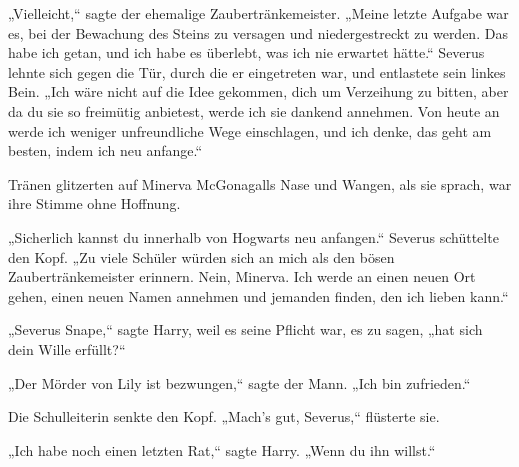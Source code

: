 „Vielleicht,“ sagte der ehemalige Zaubertränkemeister. „Meine letzte Aufgabe war es, bei der Bewachung des Steins zu versagen und niedergestreckt zu werden. Das habe ich getan, und ich habe es überlebt, was ich nie erwartet hätte.“
Severus lehnte sich gegen die Tür, durch die er eingetreten war, und entlastete sein linkes Bein.
„Ich wäre nicht auf die Idee gekommen, dich um Verzeihung zu bitten, aber da du sie so freimütig anbietest, werde ich sie dankend annehmen. Von heute an werde ich weniger unfreundliche Wege einschlagen, und ich denke, das geht am besten, indem ich neu anfange.“

Tränen glitzerten auf Minerva McGonagalls Nase und Wangen, als sie sprach, war ihre Stimme ohne Hoffnung.

„Sicherlich kannst du innerhalb von Hogwarts neu anfangen.“
Severus schüttelte den Kopf.
„Zu viele Schüler würden sich an mich als den bösen Zaubertränkemeister erinnern. Nein, Minerva. Ich werde an einen neuen Ort gehen, einen neuen Namen annehmen und jemanden finden, den ich lieben kann.“

„Severus Snape,“ sagte Harry, weil es seine Pflicht war, es zu sagen, „hat sich dein Wille erfüllt?“

„Der Mörder von Lily ist bezwungen,“ sagte der Mann. „Ich bin zufrieden.“

Die Schulleiterin senkte den Kopf.
„Mach's gut, Severus,“ flüsterte sie.

„Ich habe noch einen letzten Rat,“ sagte Harry. „Wenn du ihn willst.“

